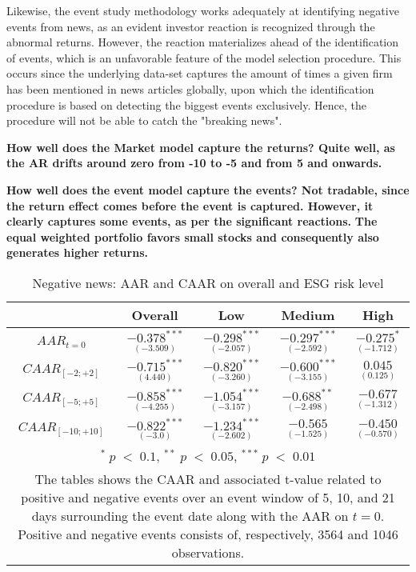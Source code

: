 Likewise, the event study methodology works adequately at identifying negative events from news, as an evident investor reaction is recognized through the abnormal returns. However, the reaction materializes ahead of the identification of events, which is an unfavorable feature of the model selection procedure. This occurs since the underlying data-set captures the amount of times a given firm has been mentioned in news articles globally, upon which the identification procedure is based on detecting the biggest events exclusively. Hence, the procedure will not be able to catch the "breaking news". 


\textbf{How well does the Market model capture the returns? Quite well, as the AR drifts around zero from -10 to -5 and from 5 and onwards. }

\textbf{How well does the event model capture the events? Not tradable, since the return effect comes before the event is captured. However, it clearly captures some events, as per the significant reactions. }
\textbf{The equal weighted portfolio favors small stocks and consequently also generates higher returns. }


\begin{table}[H]
\centering
\caption{Negative news: AAR and CAAR on overall and ESG risk level} 
\begin{tabular}{ccccc}
  \hline  \hline
  & \multicolumn{1}{c}{Overall} &  \multicolumn{1}{c}{Low} & \multicolumn{1}{c}{Medium} & \multicolumn{1}{c}{High}\\  
 \hline
$AAR_{t=0}$ &   $\underset{(-3.509)}{-0.378^{***}}$ &   $\underset{(-2.057)}{-0.298^{***}}$ &   $\underset{(-2.592)}{-0.297^{***}}$ &   $\underset{(-1.712)}{-0.275^{*}}$ \\

$CAAR_{[-2;+2]}$  &  $\underset{(4.440)}{-0.715^{***}}$ &   $\underset{(-3.260)}{-0.820^{***}}$ &   $\underset{(-3.155)}{-0.600^{***}}$ &   $\underset{(0.125)}{ 0.045}$ \\ 

$CAAR_{[-5;+5]}$  &  $\underset{(-4.255)}{-0.858^{***}}$ &   $\underset{(-3.157)}{-1.054^{***}}$ &   $\underset{(-2.498)}{-0.688^{**}}$ &   $\underset{(-1.312)}{-0.677}$ \\ 

$CAAR_{[-10;+10]}$    & $\underset{(-3.0)}{-0.822^{***}}$ &   $\underset{(-2.602)}{-1.234^{***}}$ &   $\underset{(-1.525)}{-0.565}$ &   $\underset{(-0.570)}{-0.450}$ \\ 
   \hline \hline
   \multicolumn{5}{p{10cm}}{ \footnotesize $^* \; p\; <\; 0.1$, $ ^{**} \; p\; <\; 0.05$, $ ^{***} \; p\; <\; 0.01$  } \\
   \multicolumn{5}{p{10cm}}{\footnotesize The tables shows the CAAR and associated t-value related to positive and negative events over an event window of 5, 10, and 21 days surrounding the event date along with the AAR on $t=0$. Positive and negative events consists of, respectively, 3564 and 1046 observations. } \\
   \hline
\end{tabular}
\label{tab: ST_neg_significance}
\end{table}



